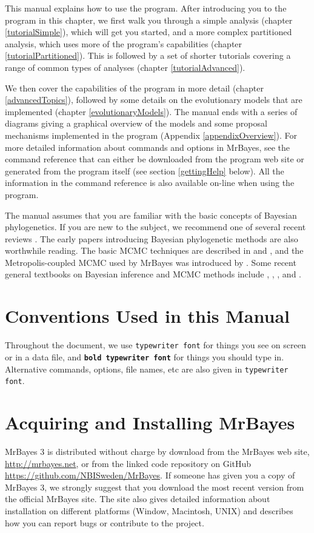 \documentclass[12pt]{book}
\newcommand{\ttt}[1]{\texttt{#1}}
\newcommand{\tb}[1]{\ttt{\textbf{#1}}}
\begin{document}
This manual explains how to use the program. After introducing you to the program in this chapter,
we first walk you through a simple analysis (chapter \ref{tutorialSimple}), which will get you
started, and a more complex partitioned analysis, which uses more of the program's capabilities
(chapter \ref{tutorialPartitioned}). This is followed by a set of shorter tutorials covering a
range of common types of analyses (chapter \ref{tutorialAdvanced}).

We then cover the capabilities of the program in more detail (chapter \ref{advancedTopics}),
followed by some details on the evolutionary models that are implemented (chapter
\ref{evolutionaryModels}). The manual ends with a series of diagrams giving a graphical overview of
the models and some proposal mechanisms implemented in the program (Appendix
\ref{appendixOverview}). For more detailed information about commands and options in MrBayes, see
the command reference that can either be downloaded from the program web site or generated from the
program itself (see section \ref{gettingHelp} below). All the information in the command reference
is also available on-line when using the program.

The manual assumes that you are familiar with the basic concepts of Bayesian phylogenetics. If you
are new to the subject, we recommend one of several recent reviews \citep{lewis01, holder03,
ronquist10}. The early papers introducing Bayesian phylogenetic methods \citep{li96, mau96,
rannala96, mau97, larget99, mau99, newton99} are also worthwhile reading. The basic MCMC techniques
are described in \citet{metropolis53} and \citet{hastings70}, and the Metropolis-coupled MCMC used
by MrBayes was introduced by \citet{geyer91}. Some recent general textbooks on Bayesian inference
and MCMC methods include \citet{gilks96a}, \citet{carlin00}, \citet{gelman03}, and
\citet{gamerman06}.


\section{Conventions Used in this Manual}
Throughout the document, we use \ttt{typewriter font} for things you see on screen or in a data
file, and \tb{bold typewriter font} for things you should type in. Alternative commands, options,
file names, etc are also given in \ttt{typewriter font}.

\section{Acquiring and Installing MrBayes}
MrBayes 3 is distributed without charge by download from the MrBayes web site,
\url{http://mrbayes.net}, or from the linked code repository on GitHub
\url{https://github.com/NBISweden/MrBayes}. If someone has given you a copy of MrBayes 3, we
strongly suggest that you download the most recent version from the official MrBayes site. The site
also gives detailed information about installation on different platforms (Window, Macintosh, UNIX)
and describes how you can report bugs or contribute to the project.
\end{document}

